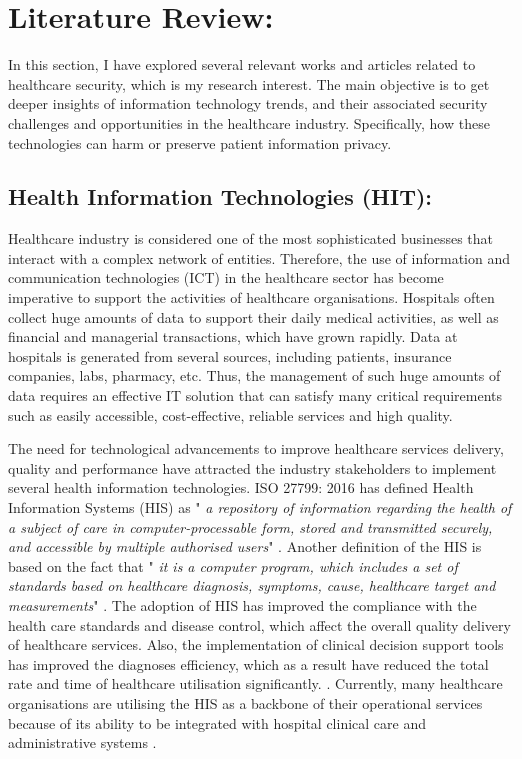 \section{Literature Review:}
In this section, I have explored several relevant works and articles related to healthcare security, which is my research interest. The main objective is to get deeper insights of information technology trends, and their associated security challenges and opportunities in the healthcare industry. Specifically, how these technologies can harm or preserve patient information privacy.
\subsection{Health Information Technologies (HIT):}

Healthcare industry is considered one of the most sophisticated businesses that interact with a complex network of entities. Therefore, the use of information and communication technologies (ICT) in the healthcare sector has become imperative to support the activities of healthcare organisations. Hospitals often collect huge amounts of data to support their daily medical activities, as well as financial and managerial transactions, which have grown rapidly. Data at hospitals is generated from several sources, including patients, insurance companies, labs, pharmacy, etc. Thus, the management of such huge amounts of data requires an effective IT solution that can satisfy many critical requirements such as easily accessible, cost-effective, reliable services and high quality.


The need for technological advancements to improve healthcare services delivery, quality and performance have attracted the industry stakeholders to implement several health information technologies. ISO 27799: 2016 has defined Health Information Systems (HIS) as " \textit{a repository of information regarding the health of a subject of care in computer-processable form, stored and transmitted securely, and accessible by multiple authorised users}"  \cite{TheInternationalOrganizationforStandardization2016}. Another definition of the HIS is based on the fact that " \textit{it is a computer program, which includes a set of standards based on healthcare diagnosis, symptoms, cause, healthcare target and measurements}"  \cite{Pai2011}. The adoption of HIS has improved the compliance with the health care standards and disease control, which affect the overall quality delivery of healthcare services. Also, the implementation of clinical decision support tools has improved the diagnoses efficiency, which as a result have reduced the total rate and time of healthcare utilisation significantly. \cite{Care2006,Akowuah2013}. Currently, many healthcare organisations are utilising the HIS as a backbone of their operational services because of its ability to be integrated with hospital clinical care and administrative systems \cite{Rahim2016}.   

